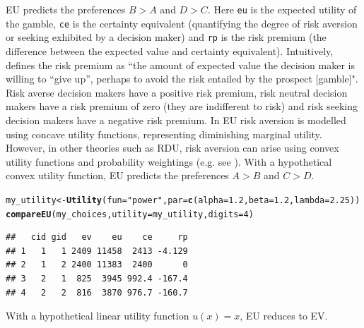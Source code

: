 \documentclass{article}\usepackage[]{graphicx}\usepackage[]{color}
\makeatletter
\newcommand{\hlnum}[1]{\textcolor[rgb]{0.686,0.059,0.569}{#1}}%
\newcommand{\hlstr}[1]{\textcolor[rgb]{0.192,0.494,0.8}{#1}}%
\newcommand{\hlstd}[1]{\textcolor[rgb]{0.345,0.345,0.345}{#1}}%
\newcommand{\hlkwb}[1]{\textcolor[rgb]{0.69,0.353,0.396}{#1}}%
\newcommand{\hlkwc}[1]{\textcolor[rgb]{0.333,0.667,0.333}{#1}}%
\newcommand{\hlkwd}[1]{\textcolor[rgb]{0.737,0.353,0.396}{\textbf{#1}}}%
\newenvironment{kframe}{%
 \def\at@end@of@kframe{}%
 \ifinner\ifhmode%
  \def\at@end@of@kframe{\end{minipage}}%
  \begin{minipage}{\columnwidth}%
 \fi\fi%
 \def\FrameCommand##1{\hskip\@totalleftmargin \hskip-\fboxsep
 \colorbox{shadecolor}{##1}\hskip-\fboxsep
     \hskip-\linewidth \hskip-\@totalleftmargin \hskip\columnwidth}%
 \MakeFramed {\advance\hsize-\width
   \@totalleftmargin\z@ \linewidth\hsize
   \@setminipage}}%
 {\par\unskip\endMakeFramed%
 \at@end@of@kframe}
\newenvironment{knitrout}{}{} %
\makeatother
\begin{document}
EU predicts the preferences $B > A$ and $D > C$.
Here {\tt eu} is the expected utility of the gamble, {\tt ce} is the certainty equivalent (quantifying the degree of risk aversion or seeking exhibited by a decision maker) and
{\tt rp} is the risk premium (the difference between the expected value and certainty equivalent). Intuitively, \citet[][p. 248]{Yates_1990} defines the risk premium as ``the amount of expected value the decision maker is willing to ``give up'', perhaps to avoid the risk entailed by the prospect [gamble]". Risk
averse decision makers have a positive risk premium, risk neutral decision makers have a
risk premium of zero (they are indifferent to risk) and risk seeking decision makers have a negative risk
premium. In EU risk aversion is modelled using concave utility functions, representing diminishing marginal utility. However, in other theories such as RDU, risk aversion can arise using convex utility functions and probability weightings (e.g. see \citet[][p. 52-53, 71-3, 175-176]{Wakker_2010}). With a hypothetical
convex utility function, EU predicts the preferences $A > B$ and $C > D$.

\begin{knitrout}
\color{fgcolor}\begin{kframe}
\begin{alltt}
\hlstd{my_utility} \hlkwb{<-} \hlkwd{Utility}\hlstd{(}\hlkwc{fun}\hlstd{=}\hlstr{"power"}\hlstd{,} \hlkwc{par}\hlstd{=}\hlkwd{c}\hlstd{(}\hlkwc{alpha}\hlstd{=}\hlnum{1.2}\hlstd{,} \hlkwc{beta}\hlstd{=}\hlnum{1.2}\hlstd{,} \hlkwc{lambda}\hlstd{=}\hlnum{2.25}\hlstd{))}
\hlkwd{compareEU}\hlstd{(my_choices,} \hlkwc{utility}\hlstd{=my_utility,} \hlkwc{digits}\hlstd{=}\hlnum{4}\hlstd{)}
\end{alltt}
\begin{verbatim}
##   cid gid   ev    eu    ce     rp
## 1   1   1 2409 11458  2413 -4.129
## 2   1   2 2400 11383  2400      0
## 3   2   1  825  3945 992.4 -167.4
## 4   2   2  816  3870 976.7 -160.7
\end{verbatim}
\end{kframe}
\end{knitrout}


With a hypothetical linear utility function $u(x)=x$, EU reduces to EV.
\end{document}
